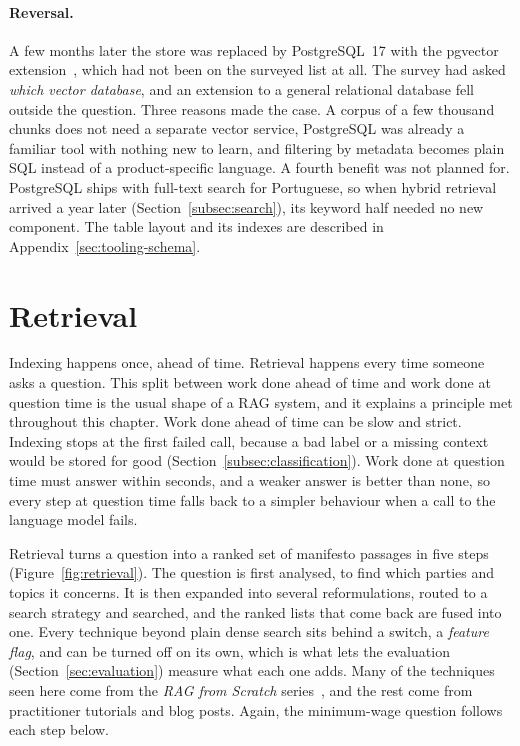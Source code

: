 \paragraph{Reversal.} A few months later the store was replaced by
PostgreSQL~17 with the pgvector extension~\citep{pgvector}, which had not been
on the surveyed list at all. The survey had asked \emph{which vector
database}, and an extension to a general relational database fell outside the
question. Three reasons made the case. A corpus of a few thousand chunks does
not need a separate vector service, PostgreSQL was already a familiar tool
with nothing new to learn, and filtering by metadata becomes plain SQL instead
of a
product-specific language. A fourth benefit was not planned for. PostgreSQL
ships with full-text search for Portuguese, so when hybrid retrieval arrived a
year later (Section~\ref{subsec:search}), its keyword half needed no new
component. The table layout and its indexes are described in
Appendix~\ref{sec:tooling-schema}.

\clearpage
\section{Retrieval} \label{sec:retrieval}

Indexing happens once, ahead of time. Retrieval happens every time someone
asks a question. This split between work done ahead of time and work done at
question time is the usual shape of a RAG system, and it explains a principle
met throughout this chapter. Work done ahead of time can be slow and strict. Indexing stops at the first
failed call, because a bad label or a missing context would be stored for good
(Section~\ref{subsec:classification}). Work done at question time must answer
within seconds, and a weaker answer is better than none, so every step at
question time falls back to a
simpler behaviour when a call to the language model fails.

Retrieval turns a question into a ranked set of manifesto passages in five
steps (Figure~\ref{fig:retrieval}). The question is first analysed, to find
which parties and topics it concerns. It is then expanded into several
reformulations, routed to a search strategy and searched, and the ranked lists
that come back are fused into one. Every technique beyond plain dense search
sits behind a switch, a \emph{feature flag}, and can be turned off on its own,
which is what lets the evaluation (Section~\ref{sec:evaluation}) measure what
each one adds. Many of the techniques seen here come from the \textit{RAG from Scratch}
series~\citep{rag-from-scratch}, and the rest come from practitioner tutorials and
blog posts. Again, the minimum-wage question follows each step below.

